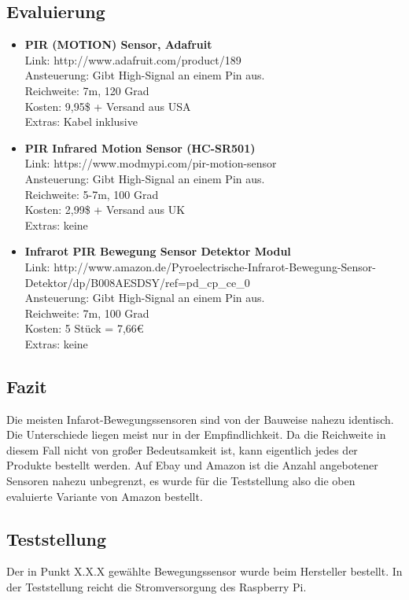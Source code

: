 \subsection{Evaluierung}
\begin{itemize}
\item \textbf{PIR (MOTION) Sensor, Adafruit}\\
Link: http://www.adafruit.com/product/189\\
Ansteuerung: Gibt High-Signal an einem Pin aus.\\
Reichweite: 7m, 120 Grad\\
Kosten: 9,95\$ + Versand aus USA\\
Extras: Kabel inklusive\\
\item \textbf{PIR Infrared Motion Sensor (HC-SR501)}\\
Link: https://www.modmypi.com/pir-motion-sensor\\
Ansteuerung: Gibt High-Signal an einem Pin aus.\\
Reichweite: 5-7m, 100 Grad\\
Kosten: 2,99\$ + Versand aus UK\\
Extras: keine\\
\item \textbf{Infrarot PIR Bewegung Sensor Detektor Modul}\\
Link: http://www.amazon.de/Pyroelectrische-Infrarot-Bewegung-Sensor-Detektor/dp/B008AESDSY/ref=pd\_cp\_ce\_0\\
Ansteuerung: Gibt High-Signal an einem Pin aus.\\
Reichweite: 7m, 100 Grad\\
Kosten: 5 Stück = 7,66€\\
Extras: keine\\
\end{itemize}

\subsection{Fazit}
Die meisten Infarot-Bewegungssensoren sind von der Bauweise nahezu identisch. Die Unterschiede liegen meist nur in der Empfindlichkeit. Da die Reichweite in diesem Fall nicht von großer Bedeutsamkeit ist, kann eigentlich jedes der Produkte bestellt werden. Auf Ebay und Amazon ist die Anzahl angebotener Sensoren nahezu unbegrenzt, es wurde für die Teststellung also die oben evaluierte Variante von Amazon bestellt. 
\subsection{Teststellung}
Der in Punkt X.X.X gewählte Bewegungssensor wurde beim Hersteller bestellt. In der Teststellung reicht die Stromversorgung des Raspberry Pi. 
